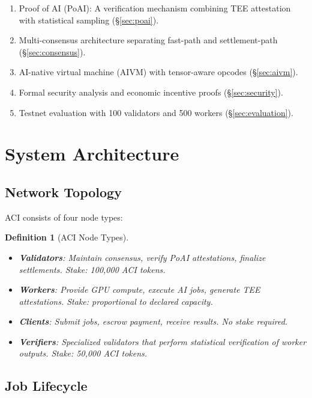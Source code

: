 \documentclass[11pt,twocolumn]{article}
\newtheorem{definition}{Definition}
\begin{document}
\begin{enumerate}[leftmargin=1.4em]
    \item Proof of AI (PoAI): A verification mechanism combining TEE attestation with statistical sampling (\S\ref{sec:poai}).
    \item Multi-consensus architecture separating fast-path and settlement-path (\S\ref{sec:consensus}).
    \item AI-native virtual machine (AIVM) with tensor-aware opcodes (\S\ref{sec:aivm}).
    \item Formal security analysis and economic incentive proofs (\S\ref{sec:security}).
    \item Testnet evaluation with 100 validators and 500 workers (\S\ref{sec:evaluation}).
\end{enumerate}

\section{System Architecture}
\label{sec:architecture}

\subsection{Network Topology}

ACI consists of four node types:

\begin{definition}[ACI Node Types]
\begin{itemize}[leftmargin=1.1em]
    \item \textbf{Validators}: Maintain consensus, verify PoAI attestations, finalize settlements. Stake: 100,000 ACI tokens.
    \item \textbf{Workers}: Provide GPU compute, execute AI jobs, generate TEE attestations. Stake: proportional to declared capacity.
    \item \textbf{Clients}: Submit jobs, escrow payment, receive results. No stake required.
    \item \textbf{Verifiers}: Specialized validators that perform statistical verification of worker outputs. Stake: 50,000 ACI tokens.
\end{itemize}
\end{definition}

\subsection{Job Lifecycle}
\end{document}
